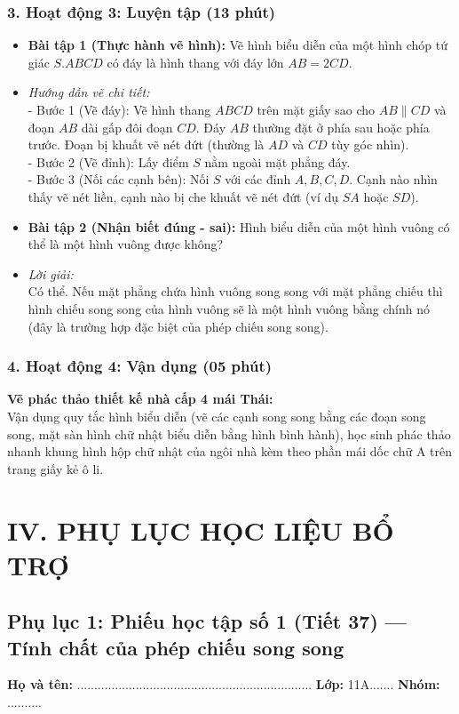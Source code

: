 \documentclass[12pt, a4paper]{article}
\begin{document}
\subsubsection*{3. Hoạt động 3: Luyện tập (13 phút)}
\begin{itemize}
    \item \textbf{Bài tập 1 (Thực hành vẽ hình):} Vẽ hình biểu diễn của một hình chóp tứ giác $S.ABCD$ có đáy là hình thang với đáy lớn $AB = 2CD$.
    \item \textit{Hướng dẫn vẽ chi tiết:}\\
    - Bước 1 (Vẽ đáy): Vẽ hình thang $ABCD$ trên mặt giấy sao cho $AB \parallel CD$ và đoạn $AB$ dài gấp đôi đoạn $CD$. Đáy $AB$ thường đặt ở phía sau hoặc phía trước. Đoạn bị khuất vẽ nét đứt (thường là $AD$ và $CD$ tùy góc nhìn).\\
    - Bước 2 (Vẽ đỉnh): Lấy điểm $S$ nằm ngoài mặt phẳng đáy.\\
    - Bước 3 (Nối các cạnh bên): Nối $S$ với các đỉnh $A, B, C, D$. Cạnh nào nhìn thấy vẽ nét liền, cạnh nào bị che khuất vẽ nét đứt (ví dụ $SA$ hoặc $SD$).
    \item \textbf{Bài tập 2 (Nhận biết đúng - sai):} Hình biểu diễn của một hình vuông có thể là một hình vuông được không?
    \item \textit{Lời giải:}\\
    Có thể. Nếu mặt phẳng chứa hình vuông song song với mặt phẳng chiếu thì hình chiếu song song của hình vuông sẽ là một hình vuông bằng chính nó (đây là trường hợp đặc biệt của phép chiếu song song).
\end{itemize}

\subsubsection*{4. Hoạt động 4: Vận dụng (05 phút)}
\textbf{Vẽ phác thảo thiết kế nhà cấp 4 mái Thái:}\\
Vận dụng quy tắc hình biểu diễn (vẽ các cạnh song song bằng các đoạn song song, mặt sàn hình chữ nhật biểu diễn bằng hình bình hành), học sinh phác thảo nhanh khung hình hộp chữ nhật của ngôi nhà kèm theo phần mái dốc chữ A trên trang giấy kẻ ô li.

\newpage

\section*{IV. PHỤ LỤC HỌC LIỆU BỔ TRỢ}

\subsection*{Phụ lục 1: Phiếu học tập số 1 (Tiết 37) --- Tính chất của phép chiếu song song}
\noindent\textbf{Họ và tên:} .................................................................... \textbf{Lớp:} 11A....... \textbf{Nhóm:} ..........
\end{document}
